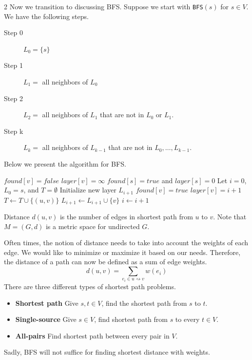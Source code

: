 \begin{multicols}{2}
    Now we transition to discussing BFS. Suppose we start with \texttt{BFS$(s)$} for $s \in V$. We have the following steps. 
    \begin{description}
        \item [Step 0] $L_0 = \{s\}$
        \item [Step 1] $L_1 = $ all neighbors of $L_0$
        \item [Step 2] $L_2 = $ all neighbors of $L_1$ that are not in $L_0$ or $L_1$. 
        \item [Step k] $L_k = $ all neighbors of $L_{k - 1}$ that are not in $L_0, \ldots, L_{k - 1}$. 
    \end{description}
    
    Below we present the algorithm for BFS. 
    \begin{algorithm}[H]
        \caption{\texttt{BFS($G = (V, E), s$)}}
        \begin{algorithmic}[1]
                \State $found[v] = false$
                \State $layer[v] = \infty$
            \EndFor
            \State $found[s] = true$ and $layer[s] = 0$
            \State Let $i = 0$, $L_0 = s$, and $T = \emptyset$
                \State Initialize new layer $L_{i + 1}$
                            \State $found[v] = true$
                            \State $layer[v] = i+1$
                            \State $T \leftarrow T\cup\{(u,v)\}$
                            \State $L_{i + 1} \leftarrow L_{i+1} \cup\{v\}$
                        \EndIf
                    \EndFor
                \EndFor
                \State $i \leftarrow i+1$
            \EndWhile
        \end{algorithmic}
    \end{algorithm}
    \begin{definition}[Distance]
        Distance $d(u,v)$ is the number of edges in shortest path from $u$ to $v$. Note that $M = (G, d)$ is a metric space for undirected $G$. 
    \end{definition}
    Often times, the notion of distance needs to take into account the weights of each edge. We would like to minimize or maximize it based on our needs. Therefore, the distance of a path can now be defined as a sum of edge weights. 
    $$
    d(u,v) = \sum_{e_i \in u \rightsquigarrow v}w(e_i)
    $$
    There are three different types of shortest path problems. 
    \begin{itemize}
        \item \textbf{Shortest path} Give $s,t \in V$, find the shortest path from $s$ to $t$. 
        \item \textbf{Single-source} Give $s \in V$, find shortest path from $s$ to every $t \in V$. 
        \item \textbf{All-pairs} Find shortest path between every pair in $V$. 
    \end{itemize}
    Sadly, BFS will not suffice for finding shortest distance with weights. 
\end{multicols}


